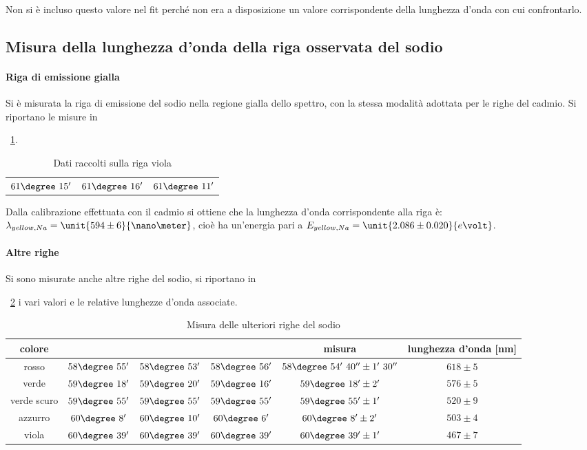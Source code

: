\documentclass[a4paper,10pt]{article}
\begin{document}
{{{{Non si è incluso questo valore nel fit perché non era a disposizione un valore corrispondente della lunghezza d'onda con cui confrontarlo.

\subsection{Misura della lunghezza d’onda della riga osservata del sodio}

\paragraph{Riga di emissione gialla}
Si è misurata la riga di emissione del sodio nella regione gialla dello spettro, con la stessa modalità adottata per le righe del cadmio.
Si riportano le misure in \tablename{~\ref{tab:gialloNa}.

\begin{table}[H]
	\centering
	\begin{tabular}{c|c|c}
		$61\degree~15'$  & $61\degree~16'$ & $61\degree~11'$\\
	\end{tabular}
	\caption{Dati raccolti sulla riga viola}
	\label{tab:gialloNa}
\end{table}

Dalla calibrazione effettuata con il cadmio si ottiene che la lunghezza d'onda corrispondente alla riga è: $\lambda_{yellow, Na} = \unit{594 \pm 6}{\nano\meter}$, cioè ha un'energia pari a $E_{yellow, Na} = \unit{2.086\pm0.020}{e\volt}$.

\paragraph{Altre righe}

Si sono misurate anche altre righe del sodio, si riportano in \tablename{~\ref{tab:moreNa} i vari valori e le relative lunghezze d'onda associate.

\begin{table}[H]
	\centering
	\begin{tabular}{c|c|c|c|c|c}
		colore &	&	&	& misura & lunghezza d'onda [nm]\\
		\hline
		rosso &	$58\degree~55'$ & $58\degree~53'$ & $58\degree~56'$ & $58\degree~54'~40'' \pm 1'~30''$ & $618 \pm 5$\\
		verde & $59\degree~18'$ & $59\degree~20'$ & $59\degree~16'$ & $59\degree~18' \pm 2'$  & $576 \pm 5$\\
		verde scuro & $59\degree~55'$ & $59\degree~55'$ & $59\degree~55'$ & $59\degree~55' \pm 1'$ & $520 \pm 9$\\
		azzurro & $60\degree~8'$ & $60\degree~10'$ & $60\degree~6'$ & $60\degree~8' \pm 2'$& $503 \pm 4$\\
		viola & $60\degree~39'$ & $60\degree~39'$ & $60\degree~39'$ & $60\degree~39' \pm 1'$ & $467 \pm 7$\\	
	\end{tabular}
	\caption{Misura delle ulteriori righe del sodio}
	\label{tab:moreNa}
\end{table}

}}}}}}
\end{document}
